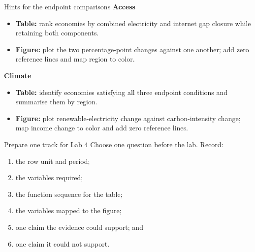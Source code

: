 \begin{frame}{Hints for the endpoint comparisons}
\textbf{Access}
\begin{itemize}
\item \textbf{Table:} rank economies by combined electricity and internet gap closure while retaining both components.
\item \textbf{Figure:} plot the two percentage-point changes against one another; add zero reference lines and map region to color.
\end{itemize}
\vspace{0.3cm}
\textbf{Climate}
\begin{itemize}
\item \textbf{Table:} identify economies satisfying all three endpoint conditions and summarise them by region.
\item \textbf{Figure:} plot renewable-electricity change against carbon-intensity change; map income change to color and add zero reference lines.
\end{itemize}
\end{frame}

\begin{frame}{Prepare one track for Lab 4}
Choose one question before the lab. Record:
\begin{enumerate}
\item the row unit and period;
\item the variables required;
\item the function sequence for the table;
\item the variables mapped to the figure;
\item one claim the evidence could support; and
\item one claim it could not support.
\end{enumerate}
\end{frame}

